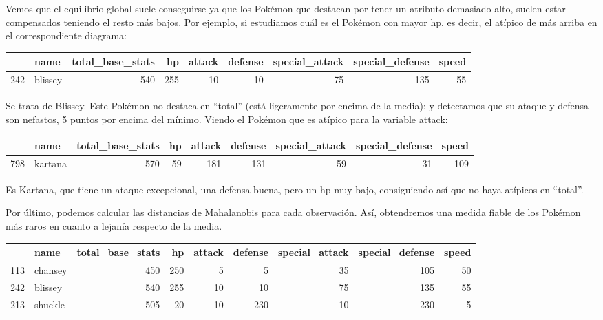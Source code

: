 \documentclass[
  12pt,
]{extreport}
\begin{document}
Vemos que el equilibrio global suele conseguirse ya que los Pokémon que
destacan por tener un atributo demasiado alto, suelen estar compensados
teniendo el resto más bajos. Por ejemplo, si estudiamos cuál es el
Pokémon con mayor hp, es decir, el atípico de más arriba en el
correspondiente diagrama:

\begin{table}[H]
\centering\begingroup\fontsize{9.5}{11.5}\selectfont

\begin{tabular}{llrrrrrrr}
\toprule
  & name & total\_base\_stats & hp & attack & defense & special\_attack & special\_defense & speed\\
\midrule
242 & blissey & 540 & 255 & 10 & 10 & 75 & 135 & 55\\
\bottomrule
\end{tabular}
\endgroup{}
\end{table}

Se trata de Blissey. Este Pokémon no destaca en ``total'' (está
ligeramente por encima de la media); y detectamos que su ataque y
defensa son nefastos, 5 puntos por encima del mínimo. Viendo el Pokémon
que es atípico para la variable attack:

\begin{table}[H]
\centering\begingroup\fontsize{9.5}{11.5}\selectfont

\begin{tabular}{llrrrrrrr}
\toprule
  & name & total\_base\_stats & hp & attack & defense & special\_attack & special\_defense & speed\\
\midrule
798 & kartana & 570 & 59 & 181 & 131 & 59 & 31 & 109\\
\bottomrule
\end{tabular}
\endgroup{}
\end{table}

Es Kartana, que tiene un ataque excepcional, una defensa buena, pero un
hp muy bajo, consiguiendo así que no haya atípicos en ``total''.

Por último, podemos calcular las distancias de Mahalanobis para cada
observación. Así, obtendremos una medida fiable de los Pokémon más raros
en cuanto a lejanía respecto de la media.

\begin{table}[H]
\centering\begingroup\fontsize{9.5}{11.5}\selectfont

\begin{tabular}{llrrrrrrr}
\toprule
  & name & total\_base\_stats & hp & attack & defense & special\_attack & special\_defense & speed\\
\midrule
113 & chansey & 450 & 250 & 5 & 5 & 35 & 105 & 50\\
242 & blissey & 540 & 255 & 10 & 10 & 75 & 135 & 55\\
213 & shuckle & 505 & 20 & 10 & 230 & 10 & 230 & 5\\
\bottomrule
\end{tabular}
\endgroup{}
\end{table}
\end{document}
